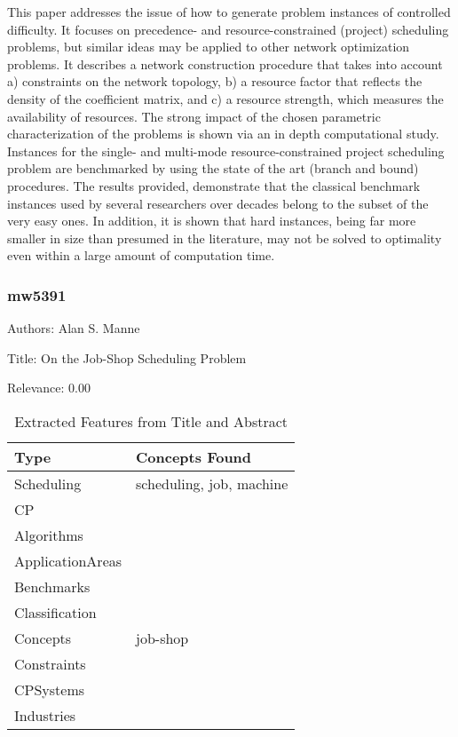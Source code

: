   This paper addresses the issue of how to generate problem instances of controlled difficulty. It focuses on precedence- and resource-constrained (project) scheduling problems, but similar ideas may be applied to other network optimization problems. It describes a network construction procedure that takes into account a) constraints on the network topology, b) a resource factor that reflects the density of the coefficient matrix, and c) a resource strength, which measures the availability of resources. The strong impact of the chosen parametric characterization of the problems is shown via an in depth computational study. Instances for the single- and multi-mode resource-constrained project scheduling problem are benchmarked by using the state of the art (branch and bound) procedures. The results provided, demonstrate that the classical benchmark instances used by several researchers over decades belong to the subset of the very easy ones. In addition, it is shown that hard instances, being far more smaller in size than presumed in the literature, may not be solved to optimality even within a large amount of computation time.  

\subsubsection{mw5391}
\label{mw:mw5391}

Authors: Alan S. Manne

Title: On the Job-Shop Scheduling Problem

Relevance:  0.00

{\scriptsize
\begin{longtable}{p{2cm}p{20cm}}
\caption{Extracted Features from Title and Abstract}\\ \toprule
Type & Concepts Found\\ \midrule
\endhead
\bottomrule
\endfoot
Scheduling & scheduling, job, machine\\ 
CP & \\ 
Algorithms & \\ 
ApplicationAreas & \\ 
Benchmarks & \\ 
Classification & \\ 
Concepts & job-shop\\ 
Constraints & \\ 
CPSystems & \\ 
Industries & \\ 
\end{longtable}
}

